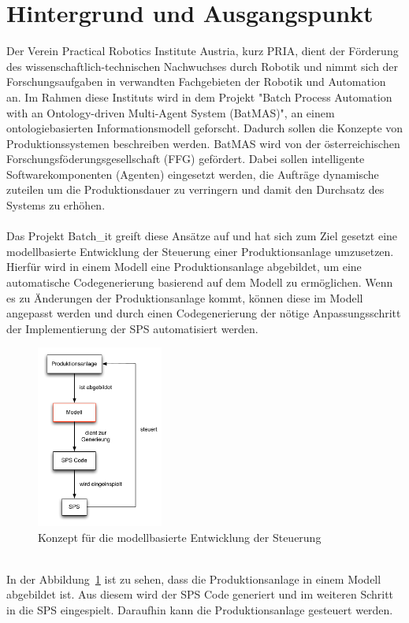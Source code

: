 \section{Hintergrund und Ausgangspunkt}
Der Verein Practical Robotics Institute Austria, kurz PRIA, dient der Förderung des wissenschaftlich-technischen Nachwuchses durch Robotik und nimmt sich der Forschungsaufgaben in verwandten Fachgebieten der Robotik und Automation an.
Im Rahmen diese Instituts wird in dem Projekt "Batch Process Automation with an On\-to\-lo\-gy-driven Multi-Agent System (BatMAS)", an einem ontologiebasierten Informationsmodell geforscht. Dadurch sollen die Konzepte von Produktionssystemen  beschreiben werden. BatMAS wird von  der österreichischen Forschungsföderungsgesellschaft (FFG) gefördert. Dabei sollen intelligente Softwarekomponenten (Agenten) eingesetzt werden, die Aufträge dynamische zuteilen um die Produktionsdauer zu verringern und damit den Durchsatz des Systems zu erhöhen.\\\\
Das Projekt Batch\_it greift diese Ansätze auf und hat sich zum Ziel gesetzt eine modellbasierte Entwicklung der Steuerung einer Produktionsanlage umzusetzen. Hierfür wird in einem Modell eine Produktionsanlage abgebildet, um eine automatische Codegenerierung basierend auf dem Modell zu ermöglichen. Wenn es zu Änderungen der Produktionsanlage kommt, können diese im Modell angepasst werden und durch einen Codegenerierung der nötige Anpassungsschritt der Implementierung der SPS automatisiert werden.
\begin{figure}[h!]
		\centering
		\includegraphics[width=0.37\textwidth]{graphics/konzept/konzept.pdf}
		\caption{Konzept für die modellbasierte Entwicklung der Steuerung}
		\label{fig:konzept}
\end{figure} \\
In der Abbildung~\ref{fig:konzept} ist zu sehen, dass die Produktionsanlage in einem Modell abgebildet ist. Aus diesem wird der SPS Code generiert und im weiteren Schritt in die SPS eingespielt. Daraufhin kann die Produktionsanlage gesteuert werden. 

